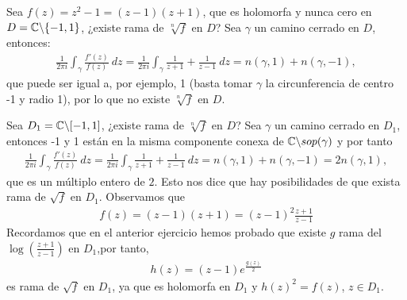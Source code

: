 \begin{ejemplo}
    Sea $f(z) = z^2 -1 = (z-1)(z+1)$, que es holomorfa y nunca cero en $D = \mathbb{C} \backslash \{-1,1\}$, ¿existe rama de $\sqrt[n]{f}$ en $D$? Sea $\gamma$ un camino cerrado en $D$, entonces:
    \begin{align*}
        \frac{1}{2\pi i} \int_{\gamma} \frac{f'(z)}{f(z)} \ dz = \frac{1}{2\pi i} \int_{\gamma} \frac{1}{z+1} + \frac{1}{z-1} \ dz = n(\gamma,1) + n(\gamma,-1),
    \end{align*}
    que puede ser igual a, por ejemplo, 1 (basta tomar $\gamma$ la circunferencia de centro -1 y radio 1), por lo que no existe $\sqrt[n]{f}$ en $D$.

    Sea $D_1 = \mathbb{C} \backslash [-1,1]$, ¿existe rama de $\sqrt[n]{f}$ en $D$? Sea $\gamma$ un camino cerrado en $D_1$, entonces -1 y 1 están en la misma componente conexa de $\mathbb{C} \backslash sop(\gamma)$ y por tanto
    \begin{align*}
        \frac{1}{2\pi i} \int_{\gamma} \frac{f'(z)}{f(z)} \ dz = \frac{1}{2\pi i} \int_{\gamma} \frac{1}{z+1} + \frac{1}{z-1} \ dz = n(\gamma,1) + n(\gamma,-1) = 2n(\gamma,1),
    \end{align*}
    que es un múltiplo entero de $2$. Esto nos dice que hay posibilidades de que exista rama de $\sqrt{f}$ en $D_1$. Observamos que
    \begin{align*}
        f(z) = (z-1)(z+1) = (z-1)^2\frac{z+1}{z-1}
    \end{align*}
    Recordamos que en el anterior ejercicio hemos probado que existe $g$ rama del $\log\left( \frac{z+1}{z-1} \right)$ en $D_1$,por tanto,
    \begin{align*}
        h(z) = (z-1)e^{\frac{g(z)}{2}}
    \end{align*}
    es rama de $\sqrt{f}$ en $D_1$, ya que es holomorfa en $D_1$ y $h(z)^2 = f(z)$, $z \in D_1$.
\end{ejemplo}